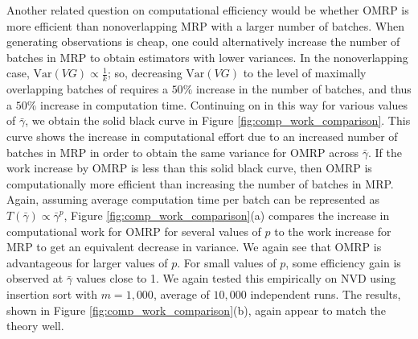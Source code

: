 \documentclass[12pt]{article}
\newcommand{\var}[1]{\mathrm{Var} \left( #1 \right)}
\newcommand{\gammab}{\bar{\gamma}}
\begin{document}
Another related question on computational efficiency would be whether OMRP is more efficient than nonoverlapping MRP with a larger number of batches.
When generating observations is cheap, one could alternatively increase the number of batches in MRP to obtain estimators with lower variances. 
In the nonoverlapping case, $\var{VG} \propto \frac{1}{k}$; so, decreasing $\var{VG}$ to the level of maximally overlapping batches of \cite{Meketon1984} requires a $50\%$ increase in the number of batches, and thus a $50\%$ increase in computation time.
Continuing on in this way for various values of $\gammab$, we obtain the solid black curve in Figure \ref{fig:comp_work_comparison}. 
This curve shows the increase in computational effort due to an increased number of batches in MRP in order to obtain the same variance for OMRP across $\gammab$.
If the work increase by OMRP is less than this solid black curve, then OMRP is computationally more efficient than increasing the number of batches in MRP. 
Again, assuming average computation time per batch can be represented as $T(\gammab) \propto \gammab^p$, Figure \ref{fig:comp_work_comparison}(a) compares the increase in computational work for OMRP for several values of $p$ to the work increase for MRP to get an equivalent decrease in variance.
We again see that OMRP is advantageous for larger values of $p$.
For small values of $p$, some efficiency gain is observed at $\gammab$ values close to 1.
We again tested this empirically on NVD using insertion sort with $m=1,000$, average of $10,000$ independent runs. 
The results, shown in Figure \ref{fig:comp_work_comparison}(b), again appear to match the theory well. 
\end{document}
